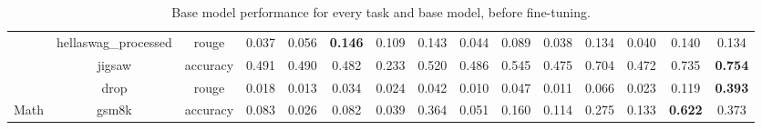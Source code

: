 \begin{landscape}
\begin{table}[ht]
{\begin{tabular}{ccccccccccccccc}
                                   & hellaswag\_processed           & rouge                            & 0.037              & 0.056             & \textbf{0.146}             & 0.109             & 0.143                      & 0.044               & 0.089                    & 0.038               & 0.134                        & 0.040                   & 0.140                  & 0.134          \\
                                   & jigsaw                         & accuracy                         & 0.491              & 0.490             & 0.482                      & 0.233             & 0.520                      & 0.486               & 0.545                    & 0.475               & 0.704                        & 0.472                   & 0.735                  & \textbf{0.754} \\
                                   & drop                           & rouge                            & 0.018              & 0.013             & 0.034                      & 0.024             & 0.042                      & 0.010               & 0.047                    & 0.011               & 0.066                        & 0.023                   & 0.119                  & \textbf{0.393} \\
\midrule
Math                               & gsm8k                          & accuracy                         & 0.083              & 0.026             & 0.082                      & 0.039             & 0.364                      & 0.051               & 0.160                    & 0.114               & 0.275                        & 0.133                   & \textbf{0.622}         & 0.373         
\end{tabular}
}

\label{table:basemodelsperformance}
\vspace{10mm}
\caption{Base model performance for every task and base model, before fine-tuning.}

\end{table}



\begin{table}[ht]
\centering


\end{table}
\end{landscape}
